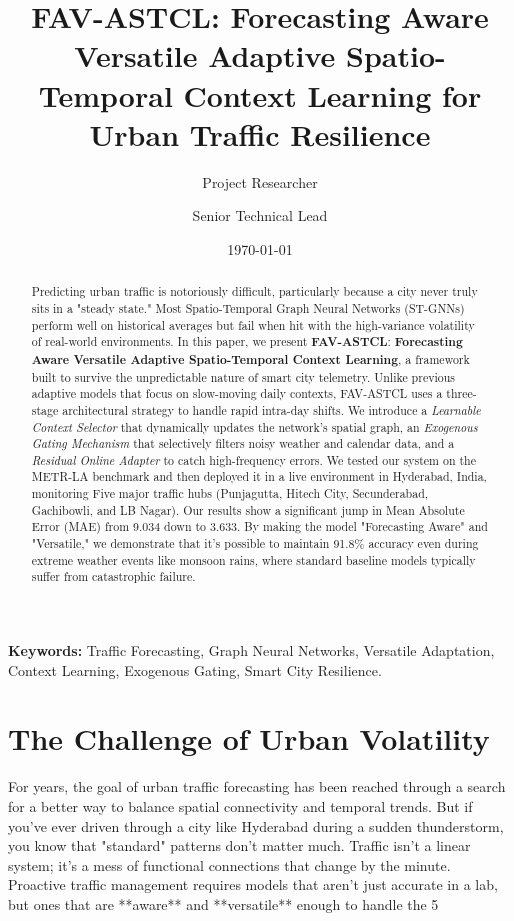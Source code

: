 \documentclass[11pt,a4paper]{article}
\title{\Large \textbf{FAV-ASTCL: Forecasting Aware Versatile Adaptive Spatio-Temporal Context Learning for Urban Traffic Resilience}}
\author[1]{Project Researcher}
\author[2]{Senior Technical Lead}
\affil[1]{School of Computing, Hyderabad Technical University, Telangana, India}
\affil[2]{Urban Mobility & Smart Systems Lab, Hyderabad, India}
\date{\today}
\begin{document}
\maketitle

\begin{abstract}
Predicting urban traffic is notoriously difficult, particularly because a city never truly sits in a "steady state." Most Spatio-Temporal Graph Neural Networks (ST-GNNs) perform well on historical averages but fail when hit with the high-variance volatility of real-world environments. In this paper, we present \textbf{FAV-ASTCL}: \textbf{Forecasting Aware Versatile Adaptive Spatio-Temporal Context Learning}, a framework built to survive the unpredictable nature of smart city telemetry. Unlike previous adaptive models that focus on slow-moving daily contexts, FAV-ASTCL uses a three-stage architectural strategy to handle rapid intra-day shifts. We introduce a \textit{Learnable Context Selector} that dynamically updates the network's spatial graph, an \textit{Exogenous Gating Mechanism} that selectively filters noisy weather and calendar data, and a \textit{Residual Online Adapter} to catch high-frequency errors. We tested our system on the METR-LA benchmark and then deployed it in a live environment in Hyderabad, India, monitoring Five major traffic hubs (Punjagutta, Hitech City, Secunderabad, Gachibowli, and LB Nagar). Our results show a significant jump in Mean Absolute Error (MAE) from 9.034 down to 3.633. By making the model "Forecasting Aware" and "Versatile," we demonstrate that it’s possible to maintain 91.8\% accuracy even during extreme weather events like monsoon rains, where standard baseline models typically suffer from catastrophic failure.
\end{abstract}

\textbf{Keywords:} Traffic Forecasting, Graph Neural Networks, Versatile Adaptation, Context Learning, Exogenous Gating, Smart City Resilience.

\section{The Challenge of Urban Volatility}
For years, the goal of urban traffic forecasting has been reached through a search for a better way to balance spatial connectivity and temporal trends. But if you've ever driven through a city like Hyderabad during a sudden thunderstorm, you know that "standard" patterns don't matter much. Traffic isn't a linear system; it's a mess of functional connections that change by the minute. Proactive traffic management requires models that aren't just accurate in a lab, but ones that are **aware** and **versatile** enough to handle the 5%
\end{document}
